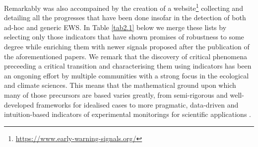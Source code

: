\documentclass[../main.tex]{subfiles}
\begin{document}
Remarkably \cite{Scheffer15} was also accompained by the creation of a website\footnote{\url{https://www.early-warning-signals.org/}} collecting and detailing all the progresses that have been done insofar in the detection of both ad-hoc and generic EWS.
In Table \ref{tab2.1} below we merge these lists by selecting only those indicators that have shown promises of robustness to some degree while enriching them with newer signals proposed after the publication of the aforementioned papers.
We remark that the discovery of critical phenomena preceeding a critical transition and characterising them using indicators has been an ongoning effort by multiple communities with a strong focus in the ecological and climate sciences.
This means that the mathematical ground upon which many of those precursors are based varies greatly, from semi-rigorous and well-developed frameworks for idealised cases \cite{Kuehn11, Kuehn13} to more pragmatic, data-driven and intuition-based indicators of experimental monitorings for scientific applications \cite{Scheffer09,Lenton11}.
\end{document}
